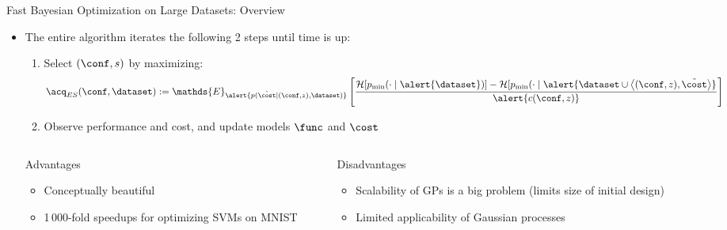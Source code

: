 \begin{frame}[c]{Fast Bayesian Optimization on Large Datasets: Overview}

\begin{itemize}
    \item The entire algorithm iterates the following 2 steps until time is up:
		\begin{enumerate}
			\item Select $(\conf,s)$ by maximizing:
    			\[{\acq}_{ES}(\conf,\dataset) := \mathds{E}_{\alert{p(\tilde{\cost}\mid (\conf, z), \dataset)}} 
            	\left[   \frac{\mathcal{H}[p_{\text{min}}(\cdot \mid \alert{\dataset})] - \mathcal{H}[p_{\text{min}}(\cdot \mid \alert{\dataset \cup \left\langle (\conf,z), \tilde{\cost} \right\rangle}}{\alert{c(\conf,z)}} \right]\]
			\item Observe performance and cost, and update models $\func$ and $\cost$ 
		\end{enumerate}

\pause

\begin{columns}[T] %
\begin{column}{.48\textwidth}


    \begin{block}{Advantages}
    \begin{itemize}
    	\item Conceptually beautiful
    	\item 1\,000-fold speedups for optimizing SVMs on MNIST
    \end{itemize}
    \end{block}
\pause
\end{column}%

\hfill%

\begin{column}{.48\textwidth}

    \begin{block}{Disadvantages}
    \begin{itemize}
    	\item \alert{Scalability} of GPs is a big problem (limits size of initial design)
    	\item Limited applicability of Gaussian processes
    \end{itemize}
\end{block}

\end{column}
\end{columns}   

\end{itemize}
\end{frame}


